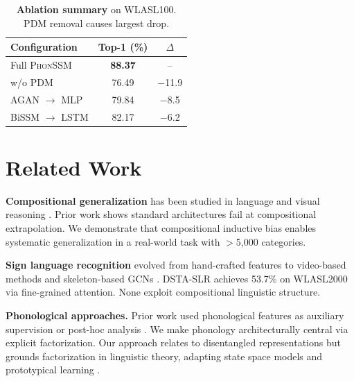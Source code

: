 \documentclass{article}
\theoremstyle{definition}
\theoremstyle{remark}
\newcommand{\phonssm}{\textsc{PhonSSM}}
\begin{document}
\begin{table}[!t]
\caption{\textbf{Ablation summary} on WLASL100. PDM removal causes largest drop.}
\label{tab:analysis}
\vspace{-2mm}
\begin{center}
\begin{small}
\begin{tabular*}{\columnwidth}{@{\extracolsep{\fill}}lcc@{}}
\toprule
Configuration & Top-1 (\%) & $\Delta$ \\
\midrule
Full \phonssm{} & \textbf{88.37} & -- \\
w/o PDM & 76.49 & $-$11.9 \\
AGAN $\rightarrow$ MLP & 79.84 & $-$8.5 \\
BiSSM $\rightarrow$ LSTM & 82.17 & $-$6.2 \\
\bottomrule
\end{tabular*}
\end{small}
\end{center}
\vspace{-4mm}
\end{table}

\section{Related Work}

\textbf{Compositional generalization} has been studied in language \citep{lake2018generalization, keysers2020measuring} and visual reasoning \citep{bahdanau2019systematic}. Prior work shows standard architectures fail at compositional extrapolation. We demonstrate that compositional inductive bias enables systematic generalization in a real-world task with $>$5,000 categories.

\textbf{Sign language recognition} evolved from hand-crafted features \citep{cooper2011sign} to video-based methods \citep{carreira2017quo, camgoz2020sign, hu2021signbert} and skeleton-based GCNs \citep{yan2018spatial, li2020word, hu2024dsta}. DSTA-SLR achieves 53.7\% on WLASL2000 via fine-grained attention. None exploit compositional linguistic structure.

\textbf{Phonological approaches.} Prior work used phonological features as auxiliary supervision \citep{koller2015continuous} or post-hoc analysis \citep{bragg2019sign}. We make phonology architecturally central via explicit factorization. Our approach relates to disentangled representations \citep{higgins2017beta} but grounds factorization in linguistic theory, adapting state space models \citep{gu2022efficiently, gu2023mamba} and prototypical learning \citep{snell2017prototypical}.
\end{document}
